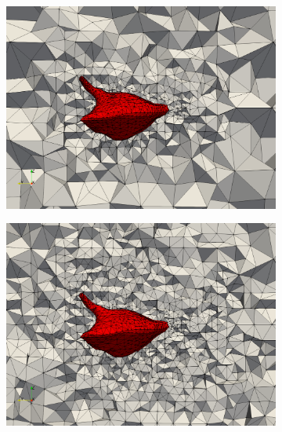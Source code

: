 %
\begin{figure}[ht!]
\centering
\begin{subfigure}{.33\textwidth}
\centering
\includegraphics[width=.99\linewidth]{img/aut_glial_mesh0.png}
\end{subfigure}%
\begin{subfigure}{0.33\textwidth}
\centering
\includegraphics[width=.99\linewidth]{img/aut_glial_mesh5.png}
\end{subfigure}%
\begin{subfigure}{0.33\textwidth}
\centering

\end{subfigure}
\end{figure}
